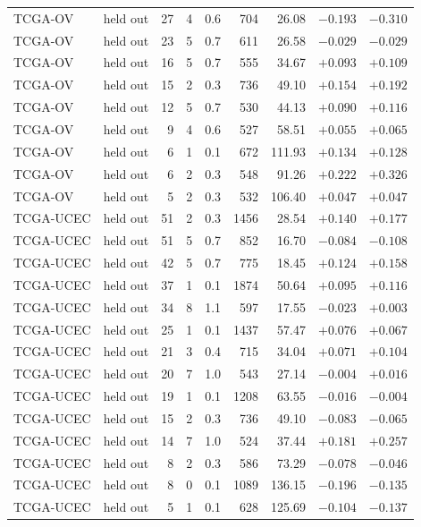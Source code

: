 \begin{longtable}{@{}llrrrrrrr@{}}
TCGA-OV & held out & 27 & 4 & 0.6 & 704 & 26.08 & $-0.193$ & $-0.310$\\
TCGA-OV & held out & 23 & 5 & 0.7 & 611 & 26.58 & $-0.029$ & $-0.029$\\
TCGA-OV & held out & 16 & 5 & 0.7 & 555 & 34.67 & $+0.093$ & $+0.109$\\
TCGA-OV & held out & 15 & 2 & 0.3 & 736 & 49.10 & $+0.154$ & $+0.192$\\
TCGA-OV & held out & 12 & 5 & 0.7 & 530 & 44.13 & $+0.090$ & $+0.116$\\
TCGA-OV & held out & 9 & 4 & 0.6 & 527 & 58.51 & $+0.055$ & $+0.065$\\
TCGA-OV & held out & 6 & 1 & 0.1 & 672 & 111.93 & $+0.134$ & $+0.128$\\
TCGA-OV & held out & 6 & 2 & 0.3 & 548 & 91.26 & $+0.222$ & $+0.326$\\
TCGA-OV & held out & 5 & 2 & 0.3 & 532 & 106.40 & $+0.047$ & $+0.047$\\
TCGA-UCEC & held out & 51 & 2 & 0.3 & 1456 & 28.54 & $+0.140$ & $+0.177$\\
TCGA-UCEC & held out & 51 & 5 & 0.7 & 852 & 16.70 & $-0.084$ & $-0.108$\\
TCGA-UCEC & held out & 42 & 5 & 0.7 & 775 & 18.45 & $+0.124$ & $+0.158$\\
TCGA-UCEC & held out & 37 & 1 & 0.1 & 1874 & 50.64 & $+0.095$ & $+0.116$\\
TCGA-UCEC & held out & 34 & 8 & 1.1 & 597 & 17.55 & $-0.023$ & $+0.003$\\
TCGA-UCEC & held out & 25 & 1 & 0.1 & 1437 & 57.47 & $+0.076$ & $+0.067$\\
TCGA-UCEC & held out & 21 & 3 & 0.4 & 715 & 34.04 & $+0.071$ & $+0.104$\\
TCGA-UCEC & held out & 20 & 7 & 1.0 & 543 & 27.14 & $-0.004$ & $+0.016$\\
TCGA-UCEC & held out & 19 & 1 & 0.1 & 1208 & 63.55 & $-0.016$ & $-0.004$\\
TCGA-UCEC & held out & 15 & 2 & 0.3 & 736 & 49.10 & $-0.083$ & $-0.065$\\
TCGA-UCEC & held out & 14 & 7 & 1.0 & 524 & 37.44 & $+0.181$ & $+0.257$\\
TCGA-UCEC & held out & 8 & 2 & 0.3 & 586 & 73.29 & $-0.078$ & $-0.046$\\
TCGA-UCEC & held out & 8 & 0 & 0.1 & 1089 & 136.15 & $-0.196$ & $-0.135$\\
TCGA-UCEC & held out & 5 & 1 & 0.1 & 628 & 125.69 & $-0.104$ & $-0.137$\\

\end{longtable}
